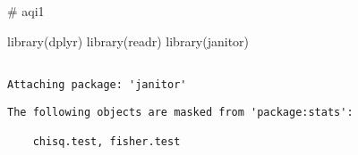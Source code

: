 \documentclass[
  12pt,
]{article}
\newenvironment{Shaded}{\begin{snugshade}}{\end{snugshade}}
\newcommand{\CommentTok}[1]{\textcolor[rgb]{0.37,0.37,0.37}{#1}}
\newcommand{\FunctionTok}[1]{\textcolor[rgb]{0.28,0.35,0.67}{#1}}
\newcommand{\NormalTok}[1]{\textcolor[rgb]{0.00,0.23,0.31}{#1}}
\begin{document}
\begin{Shaded}
\begin{Highlighting}[]
\CommentTok{\# aqi1}
\end{Highlighting}
\end{Shaded}

\begin{Shaded}
\begin{Highlighting}[]
\FunctionTok{library}\NormalTok{(dplyr)}
\FunctionTok{library}\NormalTok{(readr)}
\FunctionTok{library}\NormalTok{(janitor)}
\end{Highlighting}
\end{Shaded}

\begin{verbatim}

Attaching package: 'janitor'
\end{verbatim}

\begin{verbatim}
The following objects are masked from 'package:stats':

    chisq.test, fisher.test
\end{verbatim}
\end{document}
